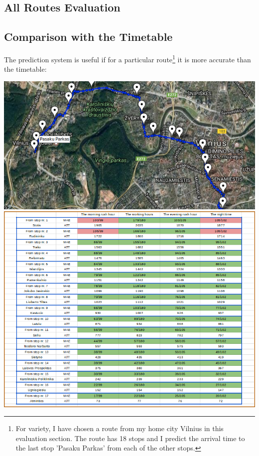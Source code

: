 \documentclass[12pt,a4paper,oneside,openright]{report}
\begin{document}
\newpage

\subsection{All Routes Evaluation}

\newpage

\subsection{Comparison with the Timetable}

The prediction system is useful if for a particular route\footnote{For variety, I have
chosen a route from my home city Vilnius in this evaluation section. The route has 18
stops and I predict the arrival time to the last stop 'Pasaku Parkas' from each of the
other stops.}
it is more accurate than the timetable:


\includegraphics[width=\textwidth]{figs/vilnius_route.png} \\

\includegraphics[width=\textwidth]{figs/table_of_vilnius.png}
\end{document}
